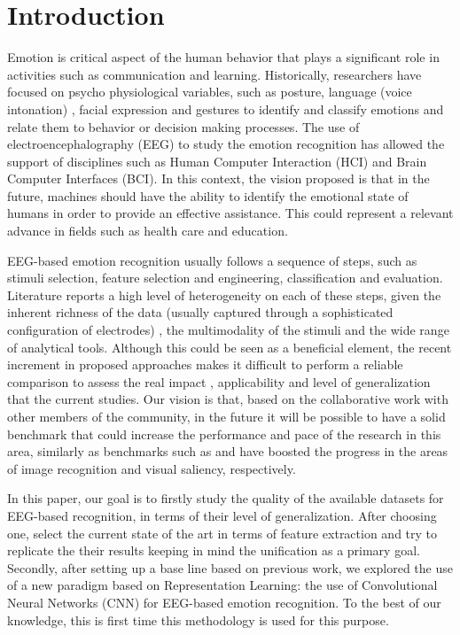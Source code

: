 \documentclass{sig-alternate}
\begin{document}
\section{Introduction}
Emotion is critical aspect of the human behavior that plays a  significant role in  activities 
such as communication and learning.  Historically, researchers have focused on psycho physiological variables, such as posture, language (voice intonation) , facial expression and gestures to identify and classify emotions and relate them to behavior or decision making processes.
The use of electroencephalography (EEG) to study the emotion recognition  has allowed the 
support of disciplines such as Human Computer Interaction (HCI) and Brain Computer Interfaces (BCI). In this context, the vision proposed is that in the future, machines should have the ability to identify the emotional state of humans in order to provide an effective assistance. This could represent a relevant advance in fields such as health care and education.

EEG-based emotion recognition usually follows a sequence of steps, such as  stimuli selection, feature selection and engineering, classification and evaluation. Literature reports a high 
level of heterogeneity on each of these steps, given the inherent
richness of the data (usually captured through a sophisticated configuration of electrodes) , the multimodality of the stimuli and the wide range of analytical tools.  Although this could be seen as a beneficial element, the recent increment in proposed approaches makes it difficult to perform a reliable 
comparison to assess the real impact , applicability  and level of generalization that the current studies.  Our vision is that, based on the collaborative work with other members of the community, in the future it will be possible to have a solid benchmark that could increase the performance and pace of the research in this area, similarly as benchmarks such as  \cite{ILSVRC15} and \cite{Judd_2012} have boosted the progress in the areas of image recognition and visual saliency, respectively. 

In this paper, our  goal is to firstly  study the quality of the available datasets for EEG-based recognition, in terms of their level of generalization. After choosing one, select the current state of the art  in terms of feature extraction and try to replicate the their results keeping  in mind the unification as a primary goal. 
Secondly, after setting up a base line based on previous work, we explored the use of a new paradigm based on Representation Learning: the use of Convolutional Neural Networks (CNN) for  EEG-based emotion recognition.  To the best of our knowledge, this is first time this methodology is used for this purpose.
\end{document}
